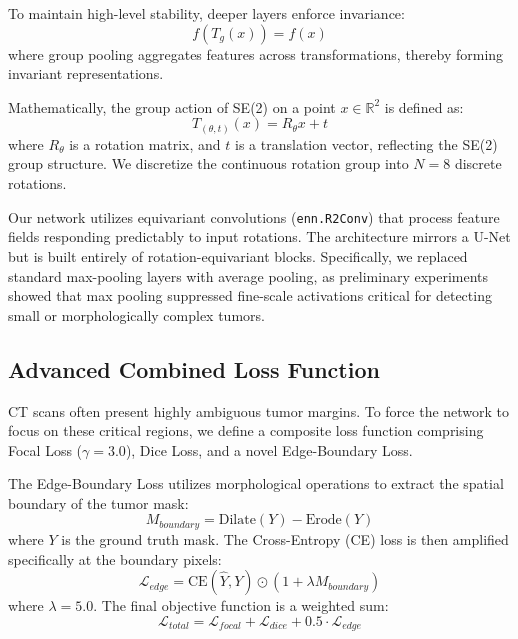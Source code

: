 \documentclass[10pt,twocolumn,letterpaper]{article}
\begin{document}
To maintain high-level stability, deeper layers enforce invariance:
\begin{equation}
    f(T_g(x)) = f(x)
\end{equation}
where group pooling aggregates features across transformations, thereby forming invariant representations. 

Mathematically, the group action of SE(2) on a point $x \in \mathbb{R}^2$ is defined as:
\begin{equation}
    T_{(\theta,t)}(x) = R_\theta x + t
\end{equation}
where $R_\theta$ is a rotation matrix, and $t$ is a translation vector, reflecting the SE(2) group structure. We discretize the continuous rotation group into $N=8$ discrete rotations.

Our network utilizes equivariant convolutions (\texttt{enn.R2Conv}) that process feature fields responding predictably to input rotations. The architecture mirrors a U-Net but is built entirely of rotation-equivariant blocks. Specifically, we replaced standard max-pooling layers with average pooling, as preliminary experiments showed that max pooling suppressed fine-scale activations critical for detecting small or morphologically complex tumors.

\subsection{Advanced Combined Loss Function}
CT scans often present highly ambiguous tumor margins. To force the network to focus on these critical regions, we define a composite loss function comprising Focal Loss ($\gamma=3.0$), Dice Loss, and a novel Edge-Boundary Loss.

The Edge-Boundary Loss utilizes morphological operations to extract the spatial boundary of the tumor mask:
\begin{equation}
    M_{boundary} = \text{Dilate}(Y) - \text{Erode}(Y)
\end{equation}
where $Y$ is the ground truth mask. The Cross-Entropy (CE) loss is then amplified specifically at the boundary pixels:
\begin{equation}
    \mathcal{L}_{edge} = \text{CE}(\hat{Y}, Y) \odot (1 + \lambda M_{boundary})
\end{equation}
where $\lambda = 5.0$. The final objective function is a weighted sum:
\begin{equation}
    \mathcal{L}_{total} = \mathcal{L}_{focal} + \mathcal{L}_{dice} + 0.5 \cdot \mathcal{L}_{edge}
\end{equation}
\end{document}

